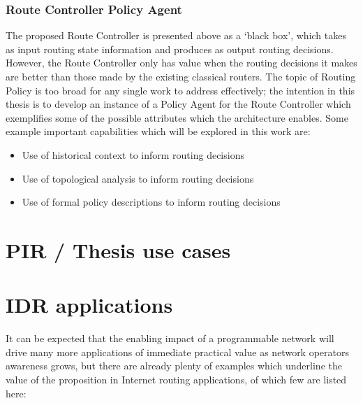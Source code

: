 \subsubsection{Route Controller Policy Agent}

The proposed Route Controller is presented above as a ‘black box’, which takes as input routing state information and produces as output routing decisions. However, the Route Controller only has value when the routing decisions it makes are better than those made by the existing classical routers. The topic of Routing Policy is too broad for any single work to address effectively; the intention in this thesis is to develop an instance of a Policy Agent for the Route Controller which exemplifies some of the possible attributes which the architecture enables. Some example important capabilities which will be explored in this work are:

\begin{itemize}
	\item Use of historical context to inform routing decisions
	\item Use of topological analysis to inform routing decisions
	\item Use of formal policy descriptions to inform routing decisions
\end{itemize}


\section{PIR / Thesis use cases}

\section{IDR applications}

It can be expected that the enabling impact of a programmable network will drive many more applications of immediate practical value as network operators awareness grows, but there are already plenty of examples which underline the value of the proposition in Internet routing applications, of which few are listed here:

